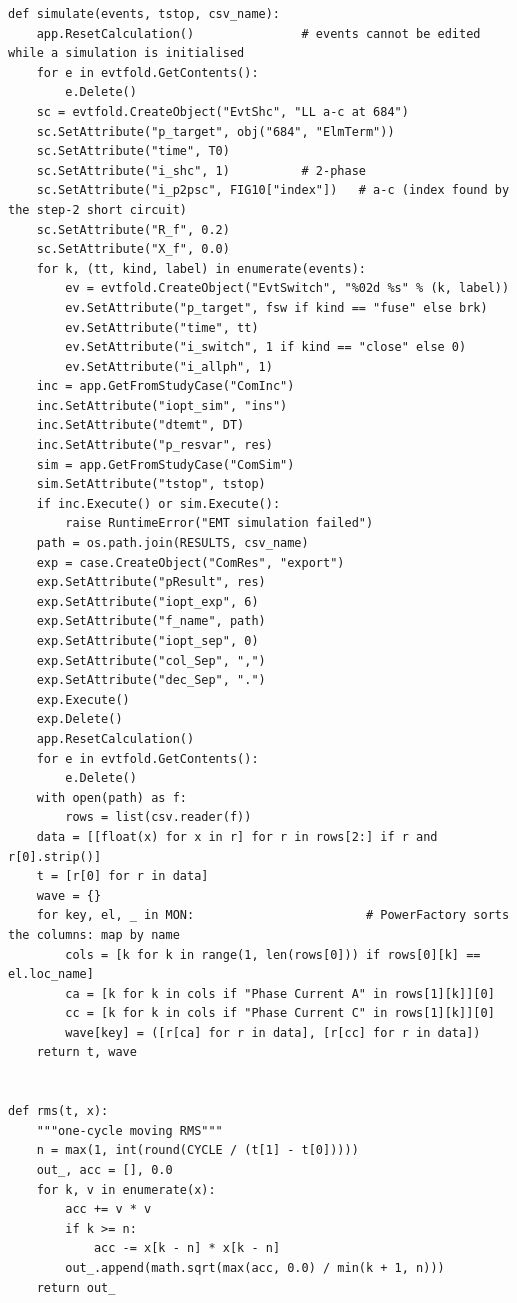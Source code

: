\documentclass[12pt,a4paper]{article}
\begin{document}
\begin{lstlisting}
def simulate(events, tstop, csv_name):
    app.ResetCalculation()               # events cannot be edited while a simulation is initialised
    for e in evtfold.GetContents():
        e.Delete()
    sc = evtfold.CreateObject("EvtShc", "LL a-c at 684")
    sc.SetAttribute("p_target", obj("684", "ElmTerm"))
    sc.SetAttribute("time", T0)
    sc.SetAttribute("i_shc", 1)          # 2-phase
    sc.SetAttribute("i_p2psc", FIG10["index"])   # a-c (index found by the step-2 short circuit)
    sc.SetAttribute("R_f", 0.2)
    sc.SetAttribute("X_f", 0.0)
    for k, (tt, kind, label) in enumerate(events):
        ev = evtfold.CreateObject("EvtSwitch", "%02d %s" % (k, label))
        ev.SetAttribute("p_target", fsw if kind == "fuse" else brk)
        ev.SetAttribute("time", tt)
        ev.SetAttribute("i_switch", 1 if kind == "close" else 0)
        ev.SetAttribute("i_allph", 1)
    inc = app.GetFromStudyCase("ComInc")
    inc.SetAttribute("iopt_sim", "ins")
    inc.SetAttribute("dtemt", DT)
    inc.SetAttribute("p_resvar", res)
    sim = app.GetFromStudyCase("ComSim")
    sim.SetAttribute("tstop", tstop)
    if inc.Execute() or sim.Execute():
        raise RuntimeError("EMT simulation failed")
    path = os.path.join(RESULTS, csv_name)
    exp = case.CreateObject("ComRes", "export")
    exp.SetAttribute("pResult", res)
    exp.SetAttribute("iopt_exp", 6)
    exp.SetAttribute("f_name", path)
    exp.SetAttribute("iopt_sep", 0)
    exp.SetAttribute("col_Sep", ",")
    exp.SetAttribute("dec_Sep", ".")
    exp.Execute()
    exp.Delete()
    app.ResetCalculation()
    for e in evtfold.GetContents():
        e.Delete()
    with open(path) as f:
        rows = list(csv.reader(f))
    data = [[float(x) for x in r] for r in rows[2:] if r and r[0].strip()]
    t = [r[0] for r in data]
    wave = {}
    for key, el, _ in MON:                        # PowerFactory sorts the columns: map by name
        cols = [k for k in range(1, len(rows[0])) if rows[0][k] == el.loc_name]
        ca = [k for k in cols if "Phase Current A" in rows[1][k]][0]
        cc = [k for k in cols if "Phase Current C" in rows[1][k]][0]
        wave[key] = ([r[ca] for r in data], [r[cc] for r in data])
    return t, wave


def rms(t, x):
    """one-cycle moving RMS"""
    n = max(1, int(round(CYCLE / (t[1] - t[0]))))
    out_, acc = [], 0.0
    for k, v in enumerate(x):
        acc += v * v
        if k >= n:
            acc -= x[k - n] * x[k - n]
        out_.append(math.sqrt(max(acc, 0.0) / min(k + 1, n)))
    return out_



\end{lstlisting}
\end{document}
